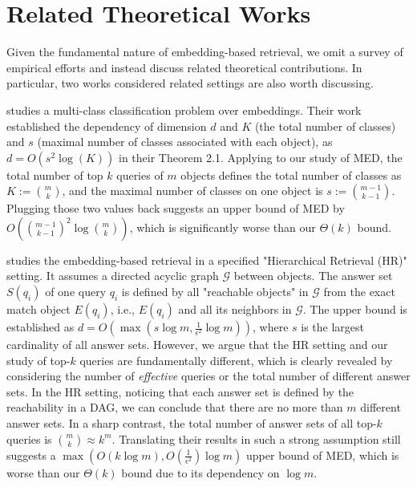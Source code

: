 \section{Related Theoretical Works}\label{sec:related}

Given the fundamental nature of embedding-based retrieval, we omit a survey of empirical efforts and instead discuss related theoretical contributions.
In particular, two works considered related settings are also worth discussing.

\citet{guo2019breaking} studies a multi-class classification problem over embeddings. Their work established the dependency of dimension $d$ and $K$ (the total number of classes) and $s$ (maximal number of classes associated with each object), as $d=O(s^2 \log (K))$ in their Theorem 2.1. Applying to our study of MED, the total number of top $k$ queries of $m$ objects defines the total number of classes as $K:=\binom{m}{k}$, and the maximal number of classes on one object is $s:=\binom{m-1}{k-1}$. Plugging those two values back suggests an upper bound of MED by $O(\binom{m-1}{k-1}^2 \log \binom{m}{k})$, which is significantly worse than our $\Theta(k)$ bound.

\citet{you2025hierarchical} studies the embedding-based retrieval in a specified "Hierarchical Retrieval (HR)" setting. It assumes a directed acyclic graph $\mathcal{G}$ between objects. The answer set $S(q_i)$ of one query $q_i$ is defined by all "reachable objects" in $\mathcal{G}$ from the exact match object $E(q_i)$, i.e., $E(q_i)$ and all its neighbors in $\mathcal{G}$. The upper bound is established as $d = O(\max(s\log m, \frac{1}{\epsilon^2} \log m))$, where $s$ is the largest cardinality of all answer sets. However, we argue that the HR setting and our study of top-$k$ queries are fundamentally different, which is clearly revealed by considering the number of \textit{effective} queries or the total number of different answer sets.  In the HR setting, noticing that each answer set is defined by the reachability in a DAG, we can conclude that there are no more than $m$ different answer sets. In a sharp contrast, the total number of answer sets of all top-$k$ queries is $\binom{m}{k} \approx k^m$. Translating their results in such a strong assumption still suggests a $\max(O(k\log m), O(\frac{1}{\epsilon^2})\log m)$ upper bound of MED, which is worse than our $\Theta(k)$ bound due to its dependency on $\log m$.
